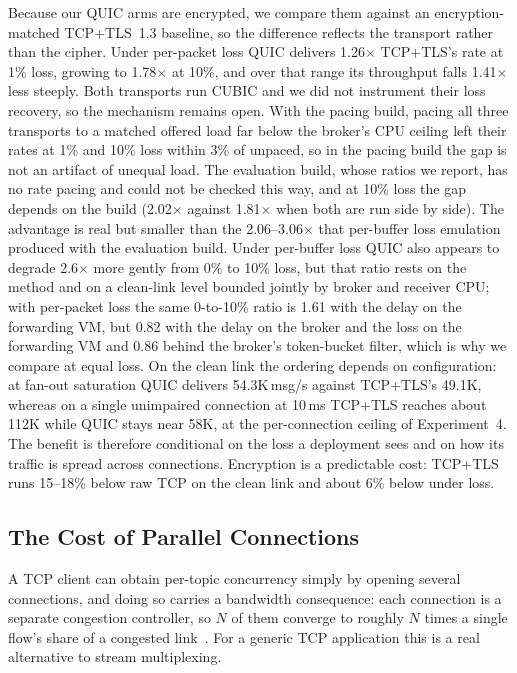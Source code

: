 \documentclass[a4paper,fleqn]{cas-dc}
\begin{document}
Because our QUIC arms are encrypted, we compare them against an encryption-matched TCP+TLS~1.3 baseline, so the difference reflects the transport rather than the cipher. Under per-packet loss QUIC delivers 1.26$\times$ TCP+TLS's rate at 1\% loss, growing to 1.78$\times$ at 10\%, and over that range its throughput falls 1.41$\times$ less steeply. Both transports run CUBIC and we did not instrument their loss recovery, so the mechanism remains open. With the pacing build, pacing all three transports to a matched offered load far below the broker's CPU ceiling left their rates at 1\% and 10\% loss within 3\% of unpaced, so in the pacing build the gap is not an artifact of unequal load. The evaluation build, whose ratios we report, has no rate pacing and could not be checked this way, and at 10\% loss the gap depends on the build (2.02$\times$ against 1.81$\times$ when both are run side by side). The advantage is real but smaller than the 2.06--3.06$\times$ that per-buffer loss emulation produced with the evaluation build. Under per-buffer loss QUIC also appears to degrade 2.6$\times$ more gently from 0\% to 10\% loss, but that ratio rests on the method and on a clean-link level bounded jointly by broker and receiver CPU; with per-packet loss the same 0-to-10\% ratio is 1.61 with the delay on the forwarding VM, but 0.82 with the delay on the broker and the loss on the forwarding VM and 0.86 behind the broker's token-bucket filter, which is why we compare at equal loss. On the clean link the ordering depends on configuration: at fan-out saturation QUIC delivers 54.3K\,msg/s against TCP+TLS's 49.1K, whereas on a single unimpaired connection at 10\,ms TCP+TLS reaches about 112K while QUIC stays near 58K, at the per-connection ceiling of Experiment~4. The benefit is therefore conditional on the loss a deployment sees and on how its traffic is spread across connections. Encryption is a predictable cost: TCP+TLS runs 15--18\% below raw TCP on the clean link and about 6\% below under loss.

\subsection{The Cost of Parallel Connections}
\label{sec:parallel}

A TCP client can obtain per-topic concurrency simply by opening several connections, and doing so carries a bandwidth consequence: each connection is a separate congestion controller, so $N$ of them converge to roughly $N$ times a single flow's share of a congested link~\cite{rfc9308, chiu1989aimd}. For a generic TCP application this is a real alternative to stream multiplexing.
\end{document}
